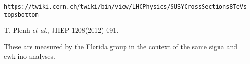 \begin{thebibliography}{10}

 {\tt https://twiki.cern.ch/twiki/bin/view/LHCPhysics/SUSYCrossSections8TeVstopsbottom}

 T. Plenh {\em et al.}, JHEP 1208(2012) 091.

 These are measured by the Florida group in the context
  of the same signa and ewk-ino analyses.











    





\end{thebibliography}
